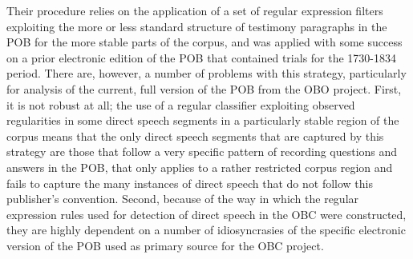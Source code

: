 Their procedure relies on the application of a set of regular expression filters exploiting the more or less standard structure of testimony paragraphs in the POB for the more stable parts of the corpus, and was applied with some success on a prior electronic edition of the POB that contained trials for the 1730-1834 period.
There are, however, a number of problems with this strategy, particularly for analysis of the current, full version of the POB from the OBO project.
First, it is not robust at all; the use of a regular classifier exploiting observed regularities in some direct speech segments in a particularly stable region of the corpus means that the only direct speech segments that are captured by this strategy are those that follow a very specific pattern of recording questions and answers in the POB, that only applies to a rather restricted corpus region and fails to capture the many instances of direct speech that do not follow this publisher's convention.
Second, because of the way in which the regular expression rules used for detection of direct speech in the OBC were constructed, they are highly dependent on a number of idiosyncrasies of the specific electronic version of the POB used as primary source for the OBC project.
